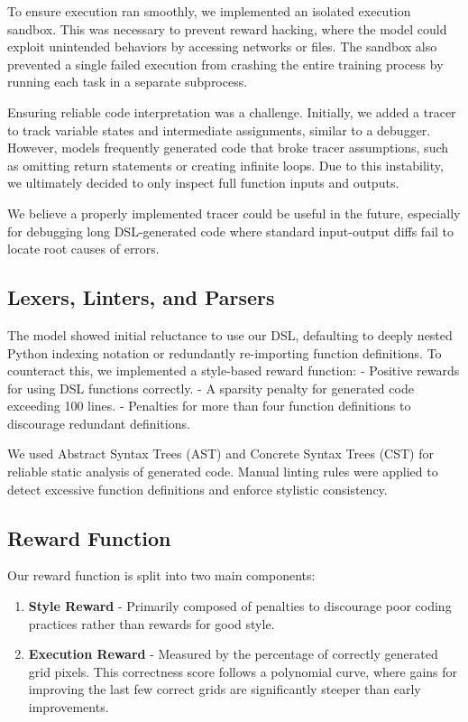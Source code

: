 \documentclass{article}
\begin{document}
To ensure execution ran smoothly, we implemented an isolated execution sandbox. This was necessary to prevent reward hacking, where the model could exploit unintended behaviors by accessing networks or files. The sandbox also prevented a single failed execution from crashing the entire training process by running each task in a separate subprocess.

Ensuring reliable code interpretation was a challenge. Initially, we added a tracer to track variable states and intermediate assignments, similar to a debugger. However, models frequently generated code that broke tracer assumptions, such as omitting return statements or creating infinite loops. Due to this instability, we ultimately decided to only inspect full function inputs and outputs.

We believe a properly implemented tracer could be useful in the future, especially for debugging long DSL-generated code where standard input-output diffs fail to locate root causes of errors.

\subsection{Lexers, Linters, and Parsers}

The model showed initial reluctance to use our DSL, defaulting to deeply nested Python indexing notation or redundantly re-importing function definitions. To counteract this, we implemented a style-based reward function:
- Positive rewards for using DSL functions correctly.
- A sparsity penalty for generated code exceeding 100 lines.
- Penalties for more than four function definitions to discourage redundant definitions.

We used Abstract Syntax Trees (AST) and Concrete Syntax Trees (CST) for reliable static analysis of generated code. Manual linting rules were applied to detect excessive function definitions and enforce stylistic consistency.

\subsection{Reward Function}

Our reward function is split into two main components:
\begin{enumerate}
  \item \textbf{Style Reward} - Primarily composed of penalties to discourage poor coding practices rather than rewards for good style.
  \item \textbf{Execution Reward} - Measured by the percentage of correctly generated grid pixels. This correctness score follows a polynomial curve, where gains for improving the last few correct grids are significantly steeper than early improvements.
\end{enumerate}
\end{document}
